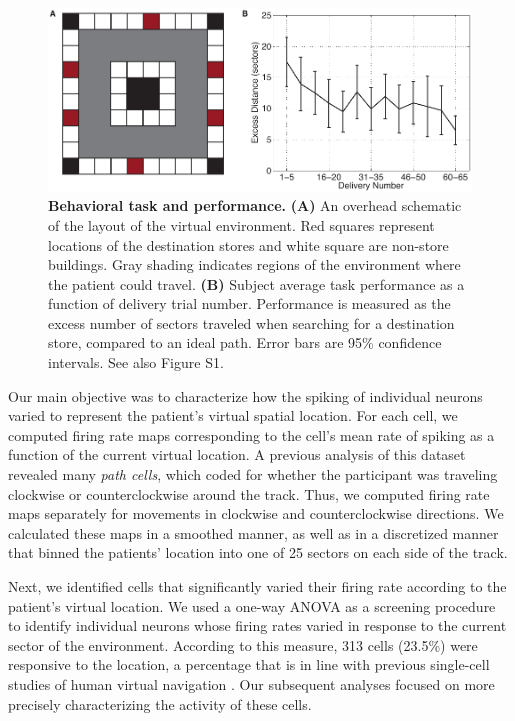 \begin{figure} \centering \includegraphics[width=.9\textwidth]{./tex/linearGrids/figs/Figure1} \caption[Behavioral task and performance]{\textbf{Behavioral task and performance.} \textbf{(A)} An overhead schematic of the layout of the virtual environment. Red squares represent locations of the destination stores and white square are non-store buildings. Gray shading indicates regions of the environment where the patient could travel. \textbf{(B)} Subject average task performance as a function of delivery trial number. Performance is measured as the excess number of sectors traveled when searching for a destination store, compared to an ideal path. Error bars are 95\% confidence intervals. See also Figure S1.} \label{fig:behaviorCurrBio}
\end{figure}


Our main objective was to characterize how the spiking of individual neurons varied to represent  the patient's virtual spatial location. For each cell, we computed firing rate maps corresponding to the cell's mean rate of spiking as a function of the current  virtual location. A previous analysis of this dataset \cite{JacoEtal10} revealed  many \emph{path cells}, which coded for whether the participant was traveling clockwise or counterclockwise around the track. Thus, we computed firing rate maps separately for movements in clockwise and counterclockwise directions. We  calculated these maps  in a smoothed manner, as well as in a discretized manner that binned the patients' location into one of 25 sectors on each side of the track.

Next, we identified cells that significantly varied their firing rate according to the patient's virtual location. We used a one-way ANOVA as a screening procedure to identify individual neurons whose firing rates varied in response to the current sector of the environment. According to this measure, 313  cells (23.5\%) were responsive to the location, a percentage that is in line with previous single-cell studies of human virtual navigation \cite{EkstEtal03,JacoEtal10,JacoEtal13}. Our subsequent analyses focused on more precisely characterizing the activity of these cells.


